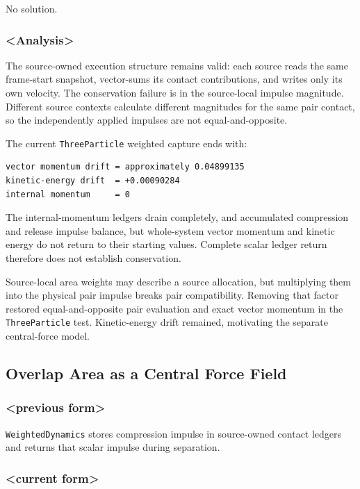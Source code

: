 No solution.

\subsubsection{<Analysis>}

The source-owned execution structure remains valid: each source reads the same
frame-start snapshot, vector-sums its contact contributions, and writes only
its own velocity.  The conservation failure is in the source-local impulse
magnitude.  Different source contexts calculate different magnitudes for the
same pair contact, so the independently applied impulses are not
equal-and-opposite.

The current \texttt{ThreeParticle} weighted capture ends with:

\begin{verbatim}
vector momentum drift = approximately 0.04899135
kinetic-energy drift  = +0.00090284
internal momentum     = 0
\end{verbatim}

The internal-momentum ledgers drain completely, and accumulated compression
and release impulse balance, but whole-system vector momentum and kinetic
energy do not return to their starting values.  Complete scalar ledger return
therefore does not establish conservation.

Source-local area weights may describe a source allocation, but multiplying
them into the physical pair impulse breaks pair compatibility.  Removing that
factor restored equal-and-opposite pair evaluation and exact vector momentum
in the \texttt{ThreeParticle} test.  Kinetic-energy drift remained, motivating
the separate central-force model.

\subsection{Overlap Area as a Central Force Field}

\subsubsection{<previous form>}

\texttt{WeightedDynamics} stores compression impulse in source-owned contact
ledgers and returns that scalar impulse during separation.

\subsubsection{<current form>}


